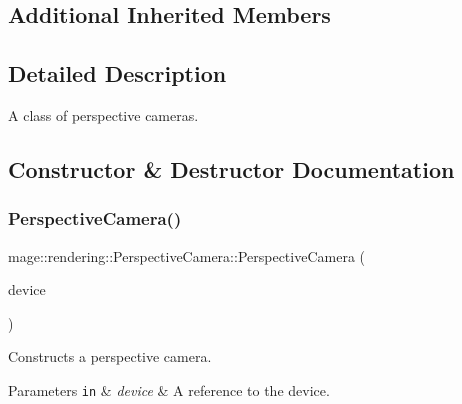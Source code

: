 \subsection*{Additional Inherited Members}


\subsection{Detailed Description}
A class of perspective cameras. 

\subsection{Constructor \& Destructor Documentation}
\hypertarget{classmage_1_1rendering_1_1_perspective_camera_ab478643eb5a2285d330b228287cc0187}{}\label{classmage_1_1rendering_1_1_perspective_camera_ab478643eb5a2285d330b228287cc0187} 
\subsubsection{\texorpdfstring{Perspective\+Camera()}{PerspectiveCamera()}\hspace{0.1cm}{\footnotesize\ttfamily [1/3]}}
{\footnotesize\ttfamily mage\+::rendering\+::\+Perspective\+Camera\+::\+Perspective\+Camera (\begin{DoxyParamCaption}\item[{I\+D3\+D11\+Device \&}]{device }\end{DoxyParamCaption})}

Constructs a perspective camera.


\begin{DoxyParams}[1]{Parameters}
\mbox{\tt in}  & {\em device} & A reference to the device. \\
\hline
\end{DoxyParams}
\hypertarget{classmage_1_1rendering_1_1_perspective_camera_ad4b54caa651462e68089436a8a1f8dc0}{}\label{classmage_1_1rendering_1_1_perspective_camera_ad4b54caa651462e68089436a8a1f8dc0} 
